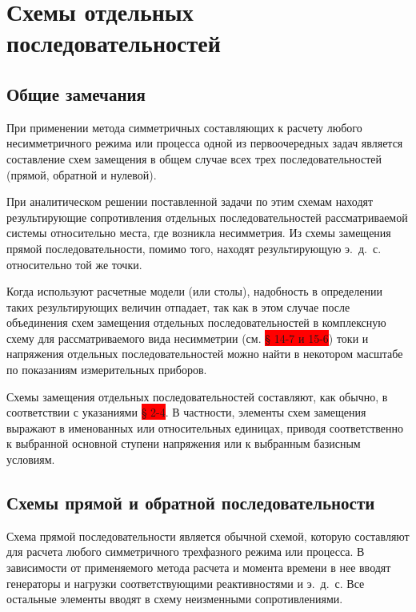 \chapter{Схемы отдельных последовательностей}
\label{chap:13 skhemy_otdelnykh_posledovatelnostei}

\section{Общие замечания}
\label{sec:13-1 obshchie_zamechaniia}

При применении метода симметричных составляющих к расчету любого несимметричного режима или процесса одной из первоочередных задач является составление схем замещения в общем случае всех трех последовательностей (прямой, обратной и нулевой).

При аналитическом решении поставленной задачи по этим схемам находят результирующие сопротивления отдельных последовательностей рассматриваемой системы относительно места, где возникла несимметрия. Из схемы замещения прямой последовательности, помимо того, находят результирующую э.~д.~с. относительно той же точки.

Когда используют расчетные модели (или столы), надобность в определении таких результирующих величин отпадает, так как в этом случае после объединения схем замещения отдельных последовательностей в комплексную схему для рассматриваемого вида несимметрии (см. \colorbox{red}{§ 14-7 и 15-6}) токи и напряжения отдельных последовательностей можно найти в некотором масштабе по показаниям измерительных приборов.

Схемы замещения отдельных последовательностей составляют, как обычно, в соответствии с указаниями \colorbox{red}{§ 2-4}. В частности, элементы схем замещения выражают в именованных или относительных единицах, приводя соответственно к выбранной основной ступени напряжения или к выбранным базисным условиям.

\section{Схемы прямой и обратной последовательности}
\label{sec:13-2 skhemy_priamoi_i_obratnoi_posledovatelnosti}

Схема прямой последовательности является обычной схемой, которую составляют для расчета любого симметричного трехфазного режима или процесса. В зависимости от применяемого метода расчета и момента времени в нее вводят генераторы и нагрузки соответствующими реактивностями и э.~д.~с. Все остальные элементы вводят в схему неизменными сопротивлениями.

